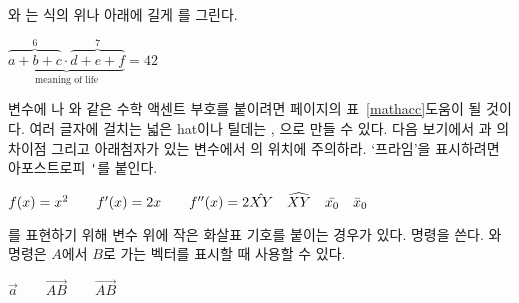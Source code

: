 와 는 
식의 위나 아래에 길게 를 그린다.
  
\begin{example}
$\underbrace{\overbrace{a+b+c}^6 
 \cdot \overbrace{d+e+f}^7}
 _\text{meaning of life} = 42$
\end{example}

변수에 나 와 같은 수학 액센트 부호를 
붙이려면 \pageref{mathacc}페이지의 표~\ref{mathacc}\가 도움이 될 것이다. 
여러 글자에 걸치는 넓은 hat이나 틸데는 , 으로 만들 수 있다.
다음 보기에서 과 의 차이점 그리고 아래첨자가 있는 변수에서 의 위치에 주의하라.
`프라임'을 표시하려면 아포스트로피 \verb|'|를 붙인다.
\begin{example}
$f(x) = x^2 \qquad f'(x) 
 = 2x \qquad f''(x) = 2\\[5pt]
 \hat{XY} \quad \widehat{XY}
 \quad \bar{x_0} \quad \bar{x}_0$
\end{example}


를 표현하기 위해 변수 위에 작은 화살표 기호를 
붙이는 경우가 있다.  명령을 쓴다. 와  명령은
$A$에서 $B$로 가는 벡터를 표시할 때 사용할 수 있다.
\begin{example}
$\vec{a} \qquad
 \vec{AB} \qquad
 \overrightarrow{AB}$
\end{example}

